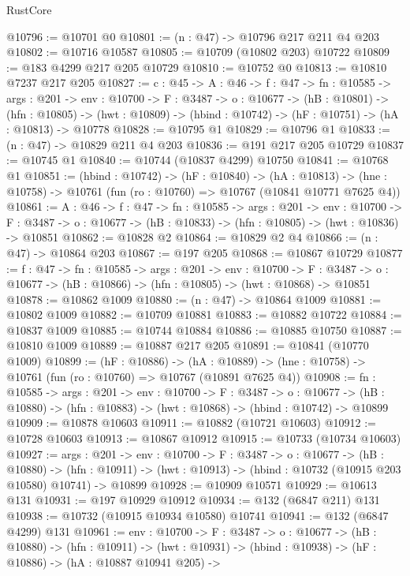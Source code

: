 \begin{lexlean}{RustCore}
\begin{coremodule}
@10796 := @10701 @0
@10801 := (n : @47) -> @10796 @217 @211 @4 @203
@10802 := @10716 @10587
@10805 := @10709 (@10802 @203) @10722
@10809 := @183 @4299 @217 @205 @10729
@10810 := @10752 @0
@10813 := @10810 @7237 @217 @205
@10827 := {c : @45} ->
  {A : @46} ->
  {f : @47} ->
  {fn : @10585} ->
  {args : @201} ->
  {env : @10700} ->
  {F : @3487} ->
  {o : @10677} ->
  (hB : @10801) ->
  (hfn : @10805) -> (hwt : @10809) -> (hbind : @10742) -> (hF : @10751) -> (hA : @10813) -> @10778
@10828 := @10795 @1
@10829 := @10796 @1
@10833 := (n : @47) -> @10829 @211 @4 @203
@10836 := @191 @217 @205 @10729
@10837 := @10745 @1
@10840 := @10744 (@10837 @4299) @10750
@10841 := @10768 @1
@10851 := (hbind : @10742) ->
  (hF : @10840) ->
  (hA : @10813) -> (hne : @10758) -> @10761 (fun (ro : @10760) => @10767 (@10841 @10771 @7625 @4))
@10861 := {A : @46} ->
  {f : @47} ->
  {fn : @10585} ->
  {args : @201} ->
  {env : @10700} ->
  {F : @3487} -> {o : @10677} -> (hB : @10833) -> (hfn : @10805) -> (hwt : @10836) -> @10851
@10862 := @10828 @2
@10864 := @10829 @2 @4
@10866 := (n : @47) -> @10864 @203
@10867 := @197 @205
@10868 := @10867 @10729
@10877 := {f : @47} ->
  {fn : @10585} ->
  {args : @201} ->
  {env : @10700} ->
  {F : @3487} -> {o : @10677} -> (hB : @10866) -> (hfn : @10805) -> (hwt : @10868) -> @10851
@10878 := @10862 @1009
@10880 := (n : @47) -> @10864 @1009
@10881 := @10802 @1009
@10882 := @10709 @10881
@10883 := @10882 @10722
@10884 := @10837 @1009
@10885 := @10744 @10884
@10886 := @10885 @10750
@10887 := @10810 @1009
@10889 := @10887 @217 @205
@10891 := @10841 (@10770 @1009)
@10899 := (hF : @10886) ->
  (hA : @10889) -> (hne : @10758) -> @10761 (fun (ro : @10760) => @10767 (@10891 @7625 @4))
@10908 := {fn : @10585} ->
  {args : @201} ->
  {env : @10700} ->
  {F : @3487} ->
  {o : @10677} -> (hB : @10880) -> (hfn : @10883) -> (hwt : @10868) -> (hbind : @10742) -> @10899
@10909 := @10878 @10603
@10911 := @10882 (@10721 @10603)
@10912 := @10728 @10603
@10913 := @10867 @10912
@10915 := @10733 (@10734 @10603)
@10927 := {args : @201} ->
  {env : @10700} ->
  {F : @3487} ->
  {o : @10677} ->
  (hB : @10880) ->
  (hfn : @10911) -> (hwt : @10913) -> (hbind : @10732 (@10915 @203 @10580) @10741) -> @10899
@10928 := @10909 @10571
@10929 := @10613 @131
@10931 := @197 @10929 @10912
@10934 := @132 (@6847 @211) @131
@10938 := @10732 (@10915 @10934 @10580) @10741
@10941 := @132 (@6847 @4299) @131
@10961 := {env : @10700} ->
  {F : @3487} ->
  {o : @10677} ->
  (hB : @10880) ->
  (hfn : @10911) ->
  (hwt : @10931) ->
  (hbind : @10938) ->
  (hF : @10886) ->
  (hA : @10887 @10941 @205) ->

\end{coremodule}
\end{lexlean}
